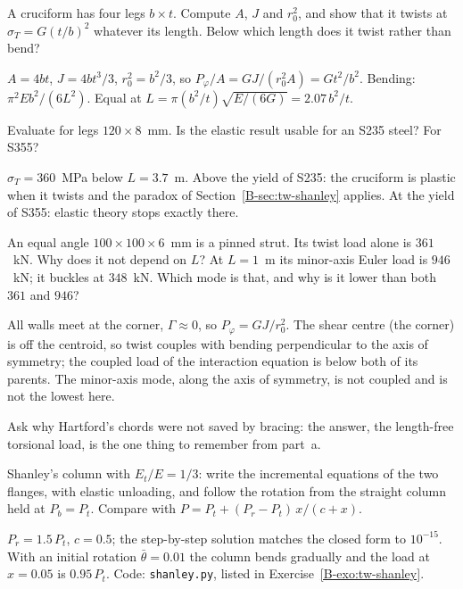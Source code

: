 
\q A cruciform has four legs $b\times t$. Compute $A$, $J$ and $r_0^2$, and show that it twists at
$\sigma_T = G(t/b)^2$ whatever its length. Below which length does it twist rather than bend?
\begin{answer}
$A = 4bt$, $J = 4bt^3/3$, $r_0^2 = b^2/3$, so $P_\varphi/A = GJ/(r_0^2A) = Gt^2/b^2$. Bending: $\pi^2Eb^2/(6L^2)$. Equal at
$L = \pi(b^2/t)\sqrt{E/(6G)} = 2.07\,b^2/t$.
\end{answer}

\q Evaluate for legs $120\times8$~mm. Is the elastic result usable for an S235 steel? For S355?
\begin{answer}
$\sigma_T = 360$~MPa below $L = 3.7$~m. Above the yield of S235: the cruciform is plastic when it twists and
the paradox of Section~\ref{B-sec:tw-shanley} applies. At the yield of S355: elastic theory stops exactly there.
\end{answer}

\q An equal angle $100\times100\times6$~mm is a pinned strut. Its twist load alone is $361$~kN. Why does it not
depend on $L$? At $L = 1$~m its minor-axis Euler load is $946$~kN; it buckles at $348$~kN. Which mode is that,
and why is it lower than both $361$ and $946$?
\begin{answer}
All walls meet at the corner, $\Gamma \approx 0$, so $P_\varphi = GJ/r_0^2$. The shear centre (the corner) is off the
centroid, so twist couples with bending perpendicular to the axis of symmetry; the coupled load of the
interaction equation is below both of its parents. The minor-axis mode, along the axis of symmetry, is not
coupled and is not the lowest here.
\end{answer}

\begin{instructor}
Ask why Hartford's chords were not saved by bracing: the answer, the length-free torsional load, is the one
thing to remember from part~a.
\end{instructor}


\qc Shanley's column with $E_t/E = 1/3$: write the incremental equations of the two flanges, with elastic
unloading, and follow the rotation from the straight column held at $P_b = P_t$. Compare with
$P = P_t + (P_r - P_t)\,x/(c + x)$.
\begin{answer}
$P_r = 1.5\,P_t$, $c = 0.5$; the step-by-step solution matches the closed form to $10^{-15}$. With an initial
rotation $\bar\theta = 0.01$ the column bends gradually and the load at $x = 0.05$ is $0.95\,P_t$. Code:
\texttt{shanley.py}, listed in Exercise~\ref{B-exo:tw-shanley}.
\end{answer}

